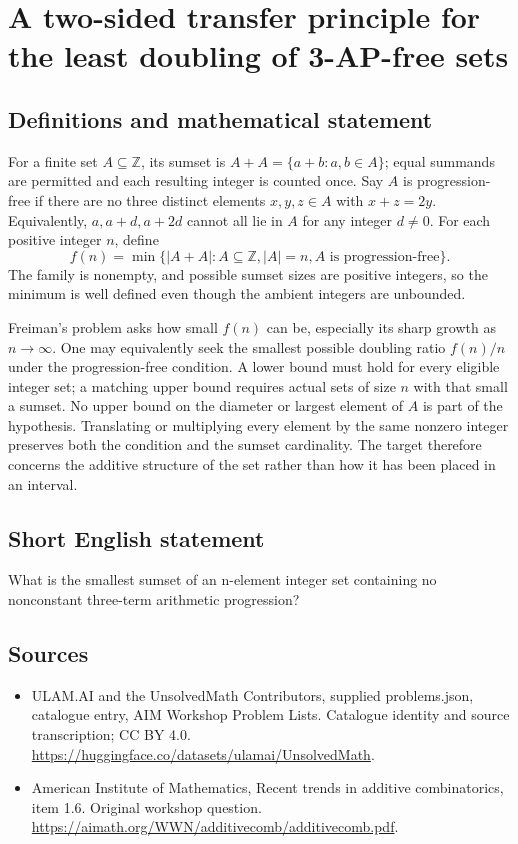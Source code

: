 \documentclass[11pt,a4paper]{article}
\begin{document}
\section*{A two-sided transfer principle for the least doubling of 3-AP-free sets}\label{statement}

\subsection{Definitions and mathematical statement}
For a finite set $A\subseteq\mathbb Z$, its sumset is
$A+A=\{a+b:a,b\in A\}$; equal summands are permitted and each
resulting integer is counted once. Say $A$ is progression-free if
there are no three distinct elements $x,y,z\in A$ with $x+z=2y$.
Equivalently, $a,a+d,a+2d$ cannot all lie in $A$ for any integer
$d\ne0$. For each positive integer $n$, define
\[
 f(n)=\min\{|A+A|:A\subseteq\mathbb Z, |A|=n,
                                   A\text{ is progression-free}\}.
\]
The family is nonempty, and possible sumset sizes are positive
integers, so the minimum is well defined even though the ambient
integers are unbounded.

Freiman's problem asks how small $f(n)$ can be, especially its sharp
growth as $n\to\infty$. One may equivalently seek the smallest
possible doubling ratio $f(n)/n$ under the progression-free condition.
A lower bound must hold for every eligible integer set; a matching
upper bound requires actual sets of size $n$ with that small a sumset.
No upper bound on the diameter or largest element of $A$ is part
of the hypothesis. Translating or multiplying every element by the
same nonzero integer preserves both the condition and the sumset
cardinality. The target therefore concerns the additive structure of
the set rather than how it has been placed in an interval.
\subsection{Short English statement}
What is the smallest sumset of an n-element integer set containing no nonconstant three-term arithmetic progression?
\subsection{Sources}
\begin{itemize}
\item[S1] ULAM.AI and the UnsolvedMath Contributors, supplied problems.json, catalogue entry, AIM Workshop Problem Lists. Catalogue identity and source transcription; CC BY 4.0.
\url{https://huggingface.co/datasets/ulamai/UnsolvedMath}.
\item[S2] American Institute of Mathematics, Recent trends in additive combinatorics, item 1.6. Original workshop question.
\url{https://aimath.org/WWN/additivecomb/additivecomb.pdf}.
\end{itemize}
\end{document}
